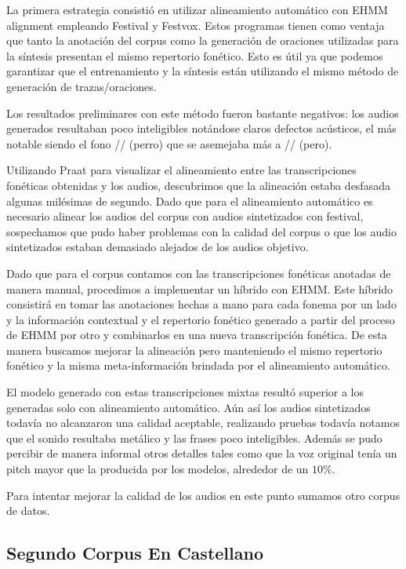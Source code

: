 La primera estrategia consistió en utilizar alineamiento automático con EHMM alignment \cite{phoneticCapturing} empleando Festival y Festvox. Estos programas tienen como ventaja que tanto la anotación del corpus como la generación de oraciones utilizadas para la síntesis presentan el mismo repertorio fonético. Esto es útil ya que podemos garantizar que el entrenamiento y la síntesis están utilizando el mismo método de generación de trazas/oraciones.

Los resultados preliminares con este método fueron bastante negativos: los audios generados resultaban poco inteligibles notándose claros defectos acústicos, el más notable siendo el fono // (perro) que se asemejaba más a // (pero).

Utilizando Praat para visualizar el alineamiento entre las transcripciones fonéticas obtenidas y los audios, descubrimos que la alineación estaba desfasada algunas milésimas de segundo. Dado que para el alineamiento automático es necesario alinear los audios del corpus con audios sintetizados con festival, sospechamos que pudo haber problemas con la calidad del corpus o que los audio sintetizados estaban demasiado alejados de los audios objetivo.

Dado que para el corpus contamos con las transcripciones fonéticas anotadas de manera manual, procedimos a implementar un híbrido con EHMM. Este híbrido  consistirá en tomar las anotaciones hechas a mano para cada fonema por un lado y la información contextual y el repertorio fonético generado a partir del proceso de EHMM por otro y combinarlos en una nueva transcripción fonética. De esta manera buscamos mejorar la alineación pero manteniendo el mismo repertorio fonético y la misma meta-información brindada por el alineamiento automático.

El modelo generado con estas transcripciones mixtas resultó superior a los generadas solo con alineamiento automático. Aún así los audios sintetizados todavía no alcanzaron una calidad aceptable, realizando pruebas todavía notamos que el sonido resultaba metálico y las frases poco inteligibles. Además se pudo percibir de manera informal otros detalles tales como que la voz original tenía un pitch mayor que la producida por los modelos, alrededor de un $10\%$.

Para intentar mejorar la calidad de los audios en este punto sumamos otro corpus de datos.

\subsection{Segundo Corpus En Castellano}

